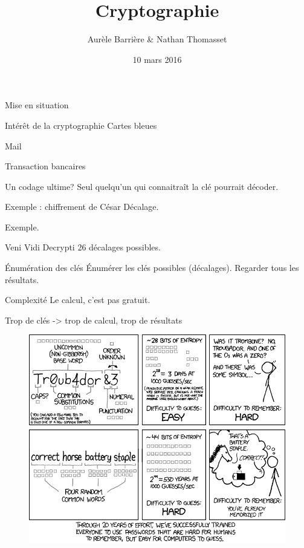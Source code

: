 \documentclass{beamer}
\author{Aurèle Barrière \& Nathan Thomasset}
\title{Cryptographie}
\date{10 mars 2016}
\begin{document}
\begin{frame}
\maketitle
\end{frame}

\begin{frame}{Mise en situation}
  \end{frame}

\begin{frame}{Intérêt de la cryptographie}
  Cartes bleues

  Mail

  Transaction bancaires
\end{frame}

\begin{frame}{Un codage ultime?}
  Seul quelqu'un qui connaitraît la clé pourrait décoder.
  \end{frame}

\begin{frame}{Exemple : chiffrement de César}
  Décalage.

  Exemple.
\end{frame}

\begin{frame}{Veni Vidi Decrypti}
  26 décalages possibles.
  \end{frame}

\begin{frame}{Énumération des clés}
  Énumérer les clés possibles (décalages). Regarder tous les résultats.
  \end{frame}

\begin{frame}{Complexité}
  Le calcul, c'est pas gratuit.

  Trop de clés -> trop de calcul, trop de résultats
  
  \begin{figure}
  \centering
  \includegraphics[scale = 0.35]{xkcdpassword_strength.png}
  \end{figure}
  \end{frame}
\end{document}
